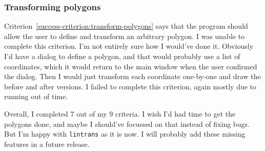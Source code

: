 \documentclass[../main.tex]{subfiles}
\begin{document}
\subsubsection{Transforming polygons\label{evaluation:evaluating-success-criteria:transform-polygons}}

Criterion~\ref{success-criterion:transform-polygons} says that the program should allow the user to define and transform an arbitrary polygon. I was unable to complete this criterion. I'm not entirely sure how I would've done it. Obviously I'd have a dialog to define a polygon, and that would probably use a list of coordinates, which it would return to the main window when the user confirmed the dialog. Then I would just transform each coordinate one-by-one and draw the before and after versions. I failed to complete this criterion, again mostly due to running out of time.

Overall, I completed 7 out of my 9 criteria. I wish I'd had time to get the polygons done, and maybe I should've focussed on that instead of fixing bugs. But I'm happy with \texttt{lintrans} as it is now. I will probably add these missing features in a future release.
\end{document}
